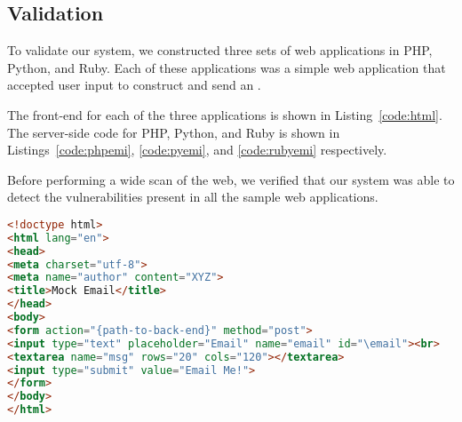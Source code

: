 \subsection{Validation}
To validate our system, we constructed three sets of web applications in PHP, Python, and Ruby. Each of these applications was a simple web application that accepted user input to construct and send an \Email.

The front-end for each of the three applications is shown in Listing~\ref{code:html}. The server-side code for PHP, Python, and Ruby is shown in Listings~\ref{code:phpemi}, \ref{code:pyemi}, and \ref{code:rubyemi} respectively.


Before performing a wide scan of the web, we verified that our system was able to detect the \ehi vulnerabilities present in all the sample web applications. 



\begin{lstlisting}[language=HTML,caption={HTML page for showcasing
      \ehi, a simple front-end for our
      examples.},label={code:html}, float]
<!doctype html>
<html lang="en">
<head>
<meta charset="utf-8">
<meta name="author" content="XYZ">
<title>Mock Email</title>
</head>
<body>
<form action="{path-to-back-end}" method="post">
<input type="text" placeholder="Email" name="email" id="\email"><br>
<textarea name="msg" rows="20" cols="120"></textarea>
<input type="submit" value="Email Me!">
</form>
</body>
</html>
\end{lstlisting}


